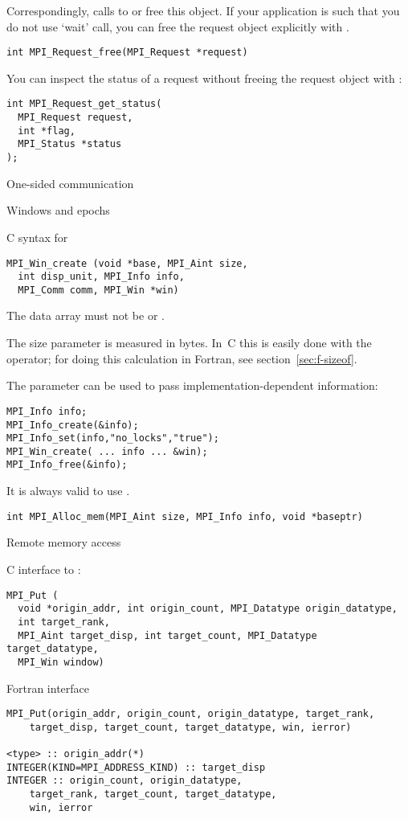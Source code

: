 Correspondingly, calls to  or 
free this object.
If your application is such that you do not use `wait' call, you can free the
request object explicitly
with .
\begin{verbatim}
int MPI_Request_free(MPI_Request *request)
\end{verbatim}

You can inspect the status of a request without freeing the request object
with :
\begin{verbatim}
int MPI_Request_get_status(
  MPI_Request request,
  int *flag,
  MPI_Status *status
);
\end{verbatim}

 {One-sided communication}

 {Windows and epochs}

C syntax for 
\begin{verbatim}
MPI_Win_create (void *base, MPI_Aint size, 
  int disp_unit, MPI_Info info, 
  MPI_Comm comm, MPI_Win *win)
\end{verbatim}
The data array must not be  or .

The size parameter is measured in bytes. In~C this is easily done
with the  operator;
for doing this calculation in Fortran, see section~\ref{sec:f-sizeof}.

The  parameter can be used to pass implementation-dependent 
information:
\begin{verbatim}
MPI_Info info;
MPI_Info_create(&info);
MPI_Info_set(info,"no_locks","true");
MPI_Win_create( ... info ... &win);
MPI_Info_free(&info);
\end{verbatim}
It is always valid to use .

\begin{verbatim}
int MPI_Alloc_mem(MPI_Aint size, MPI_Info info, void *baseptr)
\end{verbatim}

 {Remote memory access}

C interface to :
\begin{verbatim}
MPI_Put (
  void *origin_addr, int origin_count, MPI_Datatype origin_datatype,
  int target_rank,
  MPI_Aint target_disp, int target_count, MPI_Datatype target_datatype,
  MPI_Win window)
\end{verbatim}
Fortran interface
\begin{verbatim}
MPI_Put(origin_addr, origin_count, origin_datatype, target_rank,
    target_disp, target_count, target_datatype, win, ierror)

<type> :: origin_addr(*)
INTEGER(KIND=MPI_ADDRESS_KIND) :: target_disp
INTEGER :: origin_count, origin_datatype,
    target_rank, target_count, target_datatype,
    win, ierror
\end{verbatim}


